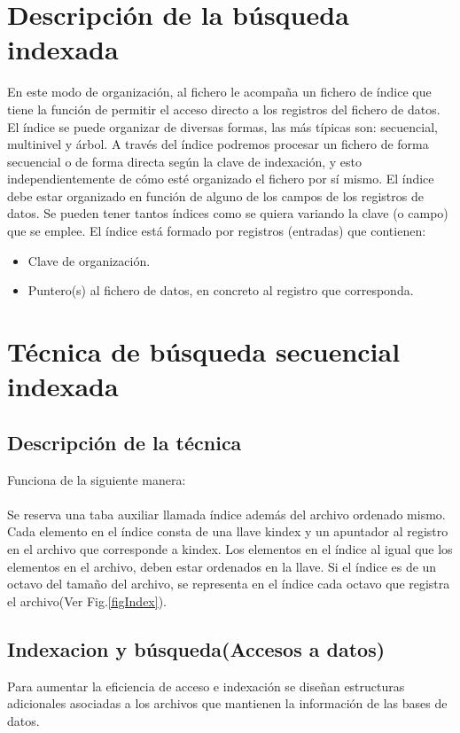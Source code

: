 \documentclass[11pt,a4paper]{article}
\begin{document}
\section{Descripción de la búsqueda indexada}
En este modo de organización, al fichero le acompaña un fichero de índice que tiene la función de permitir el acceso directo a los registros del fichero de datos. El índice se puede organizar de diversas formas, las más típicas son: secuencial, multinivel y árbol. A través del índice podremos procesar un fichero de forma secuencial o de forma directa según la clave de indexación, y esto independientemente de cómo esté organizado el fichero por sí mismo. El índice debe estar organizado en función de alguno de los campos de los registros de datos. Se pueden tener tantos índices como se quiera variando la clave (o campo) que se emplee. El índice está formado por registros (entradas) que contienen:

\begin{itemize}
\item Clave de organización.
\item Puntero(s) al fichero de datos, en concreto al registro que corresponda.
\end{itemize}

\section{Técnica de búsqueda secuencial indexada}
\subsection{Descripción de la técnica}
Funciona de la siguiente manera:\\ \\
Se reserva una taba auxiliar llamada índice además del archivo ordenado mismo. Cada elemento en el índice consta de una llave kindex y un apuntador al registro en el archivo que corresponde a kindex. Los elementos en el índice al igual que los elementos en el archivo, deben estar ordenados en la llave. Si el índice es de un octavo del tamaño del archivo, se representa en el índice cada octavo que registra el archivo(Ver Fig.\ref{figIndex}).

\subsection{Indexacion y búsqueda(Accesos a datos)}
Para aumentar la eficiencia de acceso e indexación se diseñan estructuras adicionales asociadas a los archivos que mantienen la información de las bases de datos.
\end{document}
